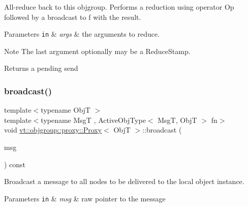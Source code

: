 All-\/reduce back to this objgroup. Performs a reduction using operator {\ttfamily Op} followed by a broadcast to {\ttfamily f} with the result. 


\begin{DoxyParams}[1]{Parameters}
\mbox{\tt in}  & {\em args} & the arguments to reduce. \\
\hline
\end{DoxyParams}
\begin{DoxyNote}{Note}
The last argument optionally may be a {\ttfamily Reduce\+Stamp}.
\end{DoxyNote}
\begin{DoxyReturn}{Returns}
a pending send 
\end{DoxyReturn}
\mbox{\label{structvt_1_1objgroup_1_1proxy_1_1_proxy_a0b716ca776b1f06e0d7d45afbe9e5274}} 
\subsubsection{\texorpdfstring{broadcast()}{broadcast()}\hspace{0.1cm}{\footnotesize\ttfamily [1/4]}}
{\footnotesize\ttfamily template$<$typename ObjT $>$ \\
template$<$typename MsgT , Active\+Obj\+Type$<$ Msg\+T, Obj\+T $>$ fn$>$ \\
void \hyperlink{structvt_1_1objgroup_1_1proxy_1_1_proxy}{vt\+::objgroup\+::proxy\+::\+Proxy}$<$ ObjT $>$\+::broadcast (\begin{DoxyParamCaption}\item[{MsgT $\ast$}]{msg }\end{DoxyParamCaption}) const}



Broadcast a message to all nodes to be delivered to the local object instance. 


\begin{DoxyParams}[1]{Parameters}
\mbox{\tt in}  & {\em msg} & raw pointer to the message \\
\hline
\end{DoxyParams}
\mbox{\label{structvt_1_1objgroup_1_1proxy_1_1_proxy_a7616a82936034b59e1b05c6b033236a2}} 
